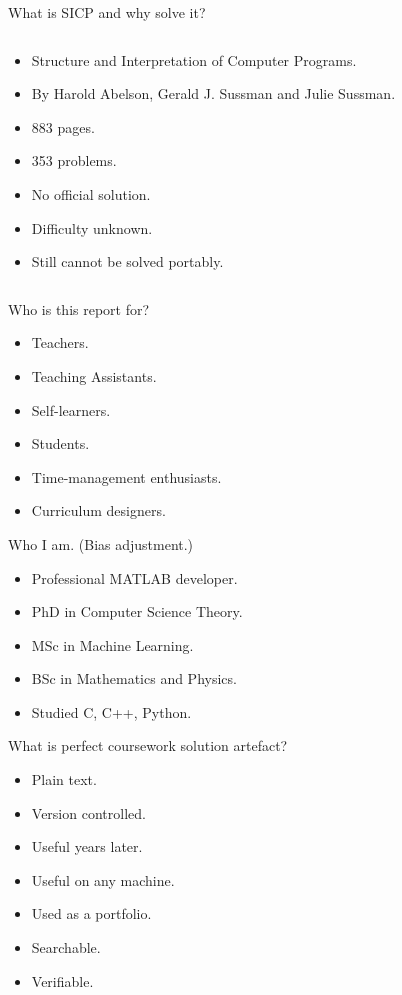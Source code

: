 \documentclass[presentation, CJK, compress]{beamer}
\begin{document}
\begin{frame}[label={sec:org26160fd}]{What is SICP and why solve it?}
\begin{columns}
\begin{column}{0.45\columnwidth}
\begin{itemize}
\item Structure and Interpretation of Computer Programs.
\item By Harold Abelson, Gerald J. Sussman and Julie Sussman.
\item 883 pages.
\item 353 problems.
\item No official solution.
\item Difficulty unknown.
\item Still cannot be solved portably.
\end{itemize}
\end{column}
\end{columns}
\end{frame}

\begin{frame}[label={sec:orge2b2c03}]{Who is this report for?}
\begin{itemize}
\item Teachers.
\item Teaching Assistants.
\item Self-learners.
\item Students.
\item Time-management enthusiasts.
\item Curriculum designers.
\end{itemize}
\end{frame}

\begin{frame}[label={sec:org0c3cdf8}]{Who I am. (Bias adjustment.)}
\begin{itemize}
\item Professional MATLAB developer.
\item PhD in Computer Science Theory.
\item MSc in Machine Learning.
\item BSc in Mathematics and Physics.
\item Studied C, C++, Python.
\end{itemize}
\end{frame}

\begin{frame}[label={sec:orgb99d260}]{What is perfect coursework solution artefact?}
\begin{itemize}
\item Plain text.
\item Version controlled.
\item Useful years later.
\item Useful on any machine.
\item Used as a portfolio.
\item Searchable.
\item Verifiable.
\end{itemize}
\end{frame}
\end{document}
